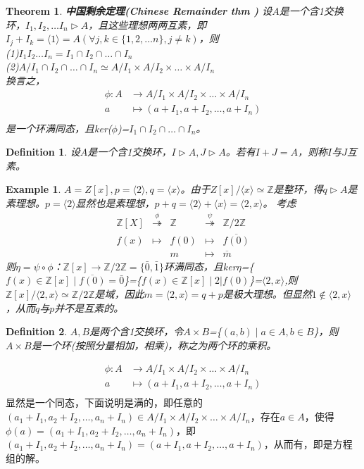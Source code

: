 \documentclass[UTF8]{article}
\newtheorem{thm}{Theorem}[section]
\newtheorem{defn}{Definition}[section]
\newtheorem{exa}{Example}[section]
\begin{document}
\begin{thm}
	\textbf{中国剩余定理(Chinese Remainder thm )}
	设$A$是一个含1交换环，$I_1,I_2,\dots I_n\vartriangleright A$，且这些理想两两互素，即$I_j+I_k=\langle 1\rangle=A(\forall j,k\in\{1,2,\dots n\},j\neq k)$，则\\
	(1)$I_1I_2\dots I_n=I_1\cap I_2\cap\dots\cap I_n$\\
	(2)$A/{I_1\cap I_2\cap\dots\cap I_n}\simeq A/{I_1}\times A/{I_2}\times\dots\times A/{I_n}$
	\\换言之，
	\[
	\begin{split}
	\phi :A&\rightarrow A/{I_1}\times A/{I_2}\times\dots\times A/{I_n}\\
	a&\longmapsto (a+I_1,a+I_2,\dots,a+I_n)\\
	\end{split}
	\]
	是一个环满同态，且ker($\phi$)=$I_1\cap I_2\cap\dots\cap I_n$。
\end{thm}

\begin{defn}
	设$A$是一个含1交换环，$I\vartriangleright A,J\vartriangleright A$。若有$I+J=A$，则称$I$与$J$互素。
\end{defn}

\begin{exa}
	$A=Z[x],p=\langle 2\rangle,q=\langle x\rangle$。由于$Z[x]/{\langle x\rangle}\simeq\mathbb Z$是整环，得$q\vartriangleright A$是素理想。$p=\langle2\rangle$显然也是素理想，$p+q=\langle2\rangle+\langle x\rangle=\langle2,x\rangle$。
	考虑$$
	\begin{array}{ccccc}
	\mathbb{Z}[X] & \stackrel{\phi}{\twoheadrightarrow} & \mathbb{Z} & \stackrel{\psi}{\twoheadrightarrow} & \mathbb{Z}/2\mathbb{Z}\\
	f(x) & \mapsto & f(0) & \mapsto & \overline{f(0)}\\
	&&m&\mapsto&\overline{m}
	\end{array}
	$$
	则$\eta=\psi\circ\phi$：$\mathbb Z[x]\rightarrow\mathbb Z/{2\mathbb Z}=\{\bar0,\bar1\}$环满同态，且ker$\eta$=\{$f(x)\in\mathbb Z[x]\mid\overline{f(0)}=\bar0$\}=\{$f(x)\in\mathbb Z[x]\mid 2|f(0)$\}=$\langle{2,x}\rangle$,则$\mathbb Z[x]/{\langle2,x\rangle}\simeq\mathbb Z/{2\mathbb Z}$是域，因此$m=\langle2,x\rangle=q+p$是极大理想。但显然$1\notin\langle2,x\rangle$，从而$q$与$p$并不是互素的。
\end{exa}

\begin{defn}
	$A,B$是两个含1交换环，令$A\times B$=\{$(a,b)\mid a\in A,b\in B$\}，则$A\times B$是一个环(按照分量相加，相乘)，称之为两个环的乘积。
\end{defn}
\[
\begin{split}
\phi :A&\rightarrow A/{I_1}\times A/{I_2}\times\dots\times A/{I_n}\\
a&\longmapsto (a+I_1,a+I_2,\dots,a+I_n)\\
\end{split}
\]
显然是一个同态，下面说明是满的，即任意的$(a_1+I_1,a_2+I_2,\dots,a_n+I_n)\in A/{I_1}\times A/{I_2}\times\dots\times A/{I_n}$，存在$a\in A$，使得$\phi(a)=(a_1+I_1,a_2+I_2,\dots,a_n+I_n)$，即$(a_1+I_1,a_2+I_2,\dots,a_n+I_n)=(a+I_1,a+I_2,\dots,a+I_n)$，从而有，即是方程组的解。
\end{document}
